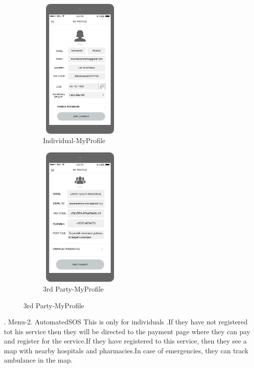\begin{figure}[H]
	\centering
	\begin{subfigure}[b]{0.4\textwidth}	
		\includegraphics[width=4cm,height=7cm]		{./RASD_Mockups/7_I-MyProfile.jpeg}
      	\caption{Individual-MyProfile}
        \label{TrackMe_indpro}
	 \end{subfigure}
     \begin{subfigure}[b]{0.4\textwidth}	
		\includegraphics[width=4cm,height=7cm]		{./RASD_Mockups/7_T-MyProfile.png}
      	\caption{3rd Party-MyProfile}
        \label{TrackMe_3ppro}
	 \end{subfigure}
\end{figure}

.\newline\newline
Menu-2. AutomatedSOS\newline
This is only for individuals .\newline If they have not registered tot his service then they will be directed to the payment page where they can pay and register for the service.\newline If they have registered to this service, then they see a map with nearby hospitals and pharmacies.\newline In case of emergencies, they can track ambulance in the map.

